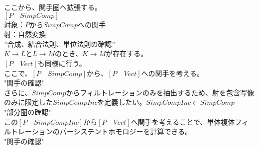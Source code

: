 \documentclass{article}
\theoremstyle{definition}
\begin{document}
ここから、関手圏へ拡張する。\\
$[P \quad SimpComp]$\\
対象：$P$から$SimpComp$への関手\\
射：自然変換\\
”合成、結合法則、単位法則の確認”\\
$K \rightarrow L$と$L \rightarrow M$のとき、$K\rightarrow M$が存在する。\\


$[P \quad Vect]$も同様に行う。\\

ここで、$[P \quad SimpComp]$から、$[P \quad Vect]$への関手を考える。\\
"関手の確認"\\


さらに、$SimpComp$からフィルトレーションのみを抽出するため、射を包含写像のみに限定した$SimpCompInc$を定義したい。$SimpCompInc \subset SimpComp$\\
"部分圏の確認"\\


この$[P\quad SimpCompInc]$から$[P \quad Vect]$へ関手を考えることで、単体複体フィルトレーションのパーシステントホモロジーを計算できる。\\
"関手の確認"
\end{document}

